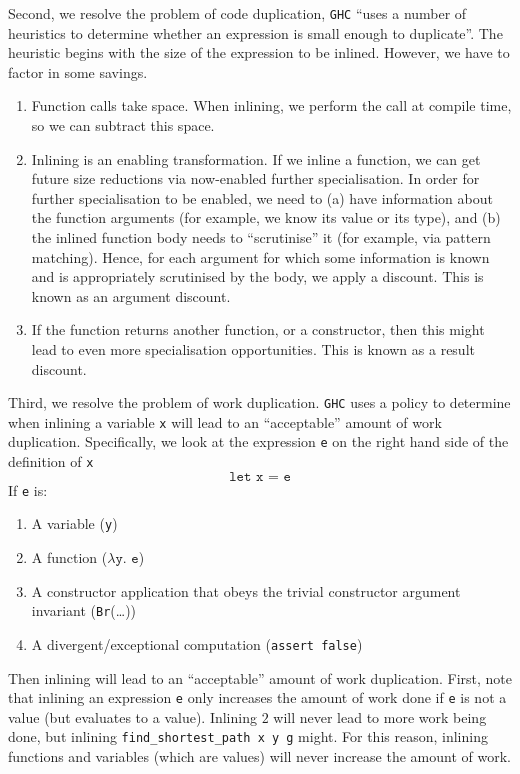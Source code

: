 Second, we resolve the problem of code duplication, \texttt{GHC} ``uses a number of heuristics to determine
whether an expression is small enough to duplicate''. The heuristic begins with the size of the expression to be inlined. However, we have to factor in some savings.
\begin{enumerate}
    \item Function calls take space. When inlining, we perform the call at compile time, so we can subtract this space.
    \item Inlining is an enabling transformation. If we inline a function, we can get future size reductions via now-enabled further specialisation. In order for further specialisation to be enabled, we need to (a) have information about the function arguments (for example, we know its value or its type), and (b) the inlined function body needs to ``scrutinise'' it (for example, via pattern matching). Hence, for each argument for which some information is known and is appropriately scrutinised by the body, we apply a discount. This is known as an argument discount. 
    \item If the function returns another function, or a constructor, then this might lead to even more specialisation opportunities. This is known as a result discount.
\end{enumerate}

Third, we resolve the problem of work duplication. \texttt{GHC} uses a policy to determine when inlining a variable \texttt{x} will lead to an ``acceptable'' amount of work duplication. Specifically, we look at the expression \texttt{e} on the right hand side of the definition of \texttt{x}
\[\texttt{let x = e}\]
If \texttt{e} is:
\begin{enumerate}
    \item A variable (\texttt{y})
    \item A function ($\lambda \texttt{y. e}$)
    \item A constructor application that obeys the trivial constructor argument invariant (\texttt{Br}(\ldots))
    \item A divergent/exceptional computation (\texttt{assert false})
\end{enumerate}
Then inlining will lead to an ``acceptable'' amount of work duplication. First, note that inlining an expression \texttt{e} only increases the amount of work done if \texttt{e} is not a value (but evaluates to a value). Inlining $2$ will never lead to more work being done, but inlining \texttt{find\_shortest\_path x y g} might. For this reason, inlining functions and variables (which are values) will never increase the amount of work. 

